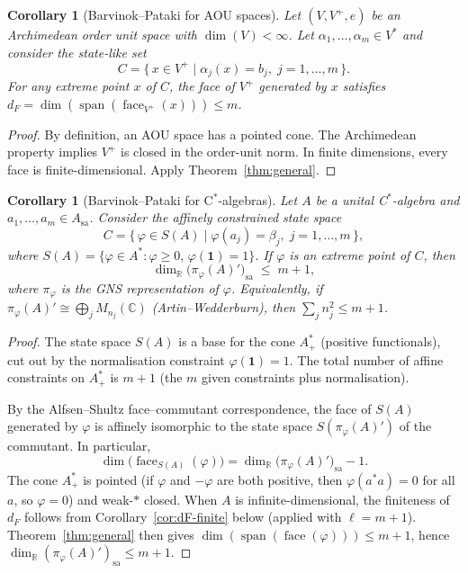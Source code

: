\documentclass[11pt,a4paper]{article}
\newtheorem{corollary}[theorem]{Corollary}
\theoremstyle{definition}
\newcommand{\R}{\mathbb{R}}
\newcommand{\sa}{\mathrm{sa}}
\newcommand{\spn}{\operatorname{span}}
\newcommand{\face}{\operatorname{face}}
\newcommand{\id}{\mathbf{1}}
\begin{document}
\begin{corollary}[Barvinok--Pataki for AOU spaces]\label{cor:aou}
Let $(V, V^+, e)$ be an Archimedean order unit space with
$\dim(V) < \infty$.  Let $\alpha_1, \dots, \alpha_m \in V^*$ and
consider the state-like set
\[
  C = \bigl\{\, x \in V^+ \;\big|\;
    \alpha_j(x) = b_j,\; j = 1, \dots, m \,\bigr\}.
\]
For any extreme point $x$ of $C$, the face of $V^+$ generated by $x$
satisfies $d_F = \dim(\spn(\face_{V^+}(x))) \leq m$.
\end{corollary}

\begin{proof}
By definition, an AOU space has a pointed cone.  The Archimedean
property implies $V^+$ is closed in the order-unit norm.  In finite
dimensions, every face is finite-dimensional.  Apply
Theorem~\ref{thm:general}.
\end{proof}

\begin{corollary}[Barvinok--Pataki for C$^*$-algebras]\label{cor:cstar}
Let $A$ be a unital C$^*$-algebra and $a_1, \dots, a_m \in A_\sa$.
Consider the affinely constrained state space
\[
  C = \bigl\{\, \varphi \in S(A) \;\big|\;
    \varphi(a_j) = \beta_j,\; j = 1, \dots, m \,\bigr\},
\]
where $S(A) = \{\varphi \in A^* : \varphi \geq 0,\, \varphi(\id) = 1\}$.
If $\varphi$ is an extreme point of $C$, then
\[
  \dim_\R\bigl(\pi_\varphi(A)'\bigr)_\sa \;\leq\; m + 1,
\]
where $\pi_\varphi$ is the GNS representation of $\varphi$.
Equivalently, if $\pi_\varphi(A)' \cong \bigoplus_j M_{n_j}(\mathbb{C})$
(Artin--Wedderburn), then $\sum_j n_j^2 \leq m + 1$.
\end{corollary}

\begin{proof}
The state space $S(A)$ is a base for the cone $A^*_+$ (positive
functionals), cut out by the normalisation constraint
$\varphi(\id) = 1$.  The total number of affine constraints on
$A^*_+$ is $m + 1$ (the $m$ given constraints plus normalisation).

By the Alfsen--Shultz face--commutant correspondence, the face
of $S(A)$ generated by $\varphi$ is affinely isomorphic to the state
space $S(\pi_\varphi(A)')$ of the commutant.  In particular,
\[
  \dim\bigl(\face_{S(A)}(\varphi)\bigr)
  = \dim_\R\bigl(\pi_\varphi(A)'\bigr)_\sa - 1.
\]
The cone $A^*_+$ is pointed (if $\varphi$ and $-\varphi$ are both
positive, then $\varphi(a^*a) = 0$ for all $a$, so $\varphi = 0$)
and weak-$*$ closed.
When $A$ is infinite-dimensional, the finiteness of $d_F$ follows
from Corollary~\ref{cor:dF-finite} below (applied with $\ell = m+1$).
Theorem~\ref{thm:general} then gives
$\dim(\spn(\face(\varphi))) \leq m + 1$, hence
$\dim_\R(\pi_\varphi(A)')_\sa \leq m + 1$.
\end{proof}
\end{document}
